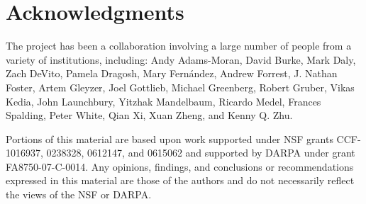 \documentclass{sig-alternate}
\begin{document}

\section*{Acknowledgments}
The \pads{} project has been a collaboration involving a large number of
people from a variety of institutions, including:
Andy Adams-Moran,
David Burke,
Mark Daly,
Zach DeVito,
Pamela Dragosh,
Mary Fern\'andez,
Andrew Forrest,
J. Nathan Foster,
Artem Gleyzer,
Joel Gottlieb,
Michael Greenberg,
Robert Gruber,
Vikas Kedia,
John Launchbury,
Yitzhak Mandelbaum,
Ricardo Medel,
Frances Spalding,
Peter White,
Qian Xi,
Xuan Zheng, and
Kenny Q. Zhu.

Portions of this material are based upon work 
supported under NSF grants CCF-1016937,  0238328,  0612147, and 0615062 and
supported by DARPA under grant FA8750-07-C-0014.
Any opinions, findings, and conclusions or recommendations
   expressed in this material are those of the authors and do not
   necessarily reflect the views of the NSF or DARPA.


%


\end{document}
